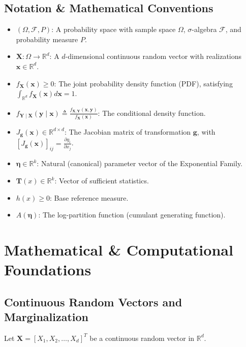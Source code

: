 \subsection{Notation \& Mathematical Conventions}
\begin{itemize}
    \item $(\Omega, \mathcal{F}, P)$: A probability space with sample space $\Omega$, $\sigma$-algebra $\mathcal{F}$, and probability measure $P$.
    \item $\mathbf{X}: \Omega \to \mathbb{R}^d$: A $d$-dimensional continuous random vector with realizations $\mathbf{x} \in \mathbb{R}^d$.
    \item $f_{\mathbf{X}}(\mathbf{x}) \ge 0$: The joint probability density function (PDF), satisfying $\int_{\mathbb{R}^d} f_{\mathbf{X}}(\mathbf{x}) d\mathbf{x} = 1$.
    \item $f_{\mathbf{Y} \mid \mathbf{X}}(\mathbf{y} \mid \mathbf{x}) \triangleq \frac{f_{\mathbf{X}, \mathbf{Y}}(\mathbf{x}, \mathbf{y})}{f_{\mathbf{X}}(\mathbf{x})}$: The conditional density function.
    \item $J_{\mathbf{g}}(\mathbf{x}) \in \mathbb{R}^{d \times d}$: The Jacobian matrix of transformation $\mathbf{g}$, with $[J_{\mathbf{g}}(\mathbf{x})]_{ij} = \frac{\partial g_i}{\partial x_j}$.
    \item $\boldsymbol{\eta} \in \mathbb{R}^k$: Natural (canonical) parameter vector of the Exponential Family.
    \item $\mathbf{T}(x) \in \mathbb{R}^k$: Vector of sufficient statistics.
    \item $h(x) \ge 0$: Base reference measure.
    \item $A(\boldsymbol{\eta})$: The log-partition function (cumulant generating function).
\end{itemize}

\section{Mathematical \& Computational Foundations}

\subsection{Continuous Random Vectors and Marginalization}
Let $\mathbf{X} = [X_1, X_2, \dots, X_d]^T$ be a continuous random vector in $\mathbb{R}^d$.

